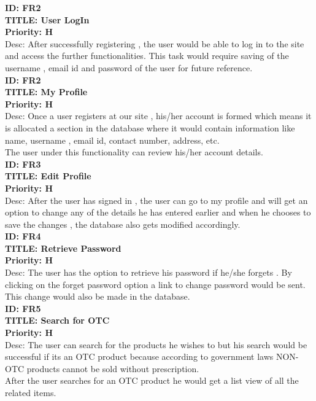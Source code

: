\documentclass{scrreprt}
\begin{document}
\textbf{ID: FR2}  \\
\textbf{TITLE: User LogIn}   \\
\textbf{Priority: H}  \\
Desc: After successfully registering , the user  would be able to log in to the site and access the further functionalities. This task would require saving of the username , email id and password of the user for future reference.  \\

\textbf{ID: FR2}   \\
\textbf{TITLE: My Profile}   \\
\textbf{Priority: H}  \\
Desc: Once a user registers at our site , his/her account is formed which means it is allocated a section in the database where it would contain information like name, username , email id, contact number, address, etc.  \\
The user under this functionality can review his/her account details.   \\

\textbf{ID: FR3}  \\
\textbf{TITLE: Edit Profile}  \\
\textbf{Priority: H}   \\
Desc:  After the user has signed in , the user can go to my profile and will get an option to change any of the details he has entered earlier  and when he chooses to save the changes , the database also gets modified accordingly.  \\

\textbf{ID: FR4}   \\
\textbf{TITLE: Retrieve Password}   \\
\textbf{Priority: H}  \\
Desc: The user has the option to retrieve his password if he/she forgets . By clicking on the forget password option a link to change password would be sent. This change would also be made in the database.   \\

\textbf{ID: FR5}  \\
\textbf{TITLE: Search for OTC}  \\ 
\textbf{Priority: H}  \\
Desc: The user can search for the products he wishes to but his search would be successful if its an OTC product because according to government laws NON-OTC products cannot be sold without prescription.  \\
After the user searches for an OTC product he would get a list view of all the related items.   \\
\end{document}
